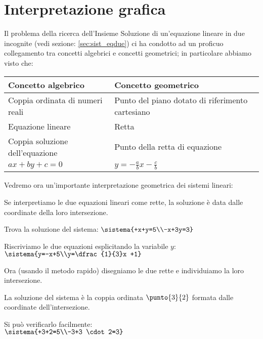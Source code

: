 \section{Interpretazione grafica}
Il problema della ricerca dell'Insieme Soluzione di
un'equazione lineare in due incognite (vedi sezione: \ref{sec:sist_eqdue}) 
ci ha condotto ad un proficuo collegamento tra concetti algebrici e 
concetti geometrici; in particolare abbiamo visto che:

\begin{center}
 \begin{tabularx}{.9\textwidth}{XX}
\toprule
 Concetto algebrico & Concetto geometrico\\
 \midrule
Coppia ordinata di numeri reali & Punto del piano dotato di riferimento 
cartesiano\\
Equazione lineare & Retta \\
Coppia soluzione dell'equazione& Punto della retta di equazione \\
\(ax+by+c=0\) & \(y=-{\frac{a}{b}}x-\frac{c}{b}\)\\
\bottomrule
 \end{tabularx}

\end{center}
Vedremo ora un'importante interpretazione geometrica dei sistemi lineari:

\begin{definizione}
Se interpretiamo le due equazioni lineari come rette, la soluzione è data 
dalle coordinate della loro intersezione.
\end{definizione}

\begin{esempio}
Trova la soluzione del sistema:
\(\sistema{+x+y=5\\-x+3y=3}\)

\vspace{1em}
\begin{minipage}{.48\textwidth}
Riscriviamo le due equazioni esplicitando la variabile \(y\):
\(\sistema{y=-x+5\\y=\dfrac{1}{3}x +1}\)

Ora (usando il metodo rapido) disegniamo le due rette e individuiamo la loro 
intersezione.

La soluzione del sistema è la coppia ordinata \(\punto{3}{2}\) formata dalle 
coordinate dell'intersezione.

Si può verificarlo facilmente:\\ 
\(\sistema{+3+2=5\\-3+3 \cdot 2=3}\)
\end{minipage}
\hfill
\begin{minipage}{.48\textwidth}
\begin{center} \intersezionediduerette \end{center}
\end{minipage}

\end{esempio}

